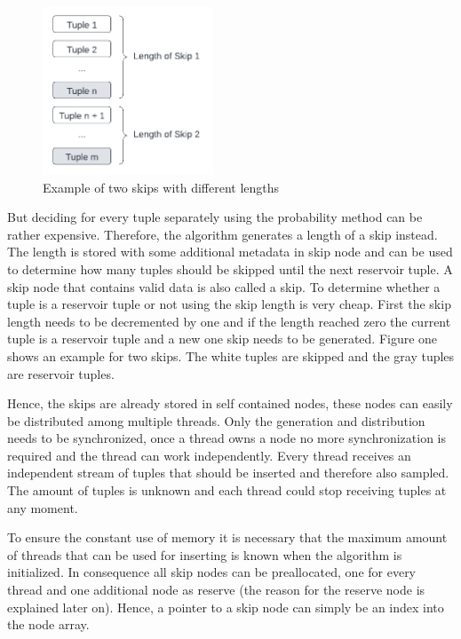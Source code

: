 \documentclass[acmlarge,nonacm]{acmart}
\begin{document}
        \begin{figure}
            \centering
            \includegraphics[height=5cm]{figure1.pdf}
            \caption{Example of two skips with different lengths}
        \end{figure}
        But deciding for every tuple separately using the probability method can be rather expensive. Therefore, the algorithm generates a length of a skip instead. The length is stored with some additional metadata in skip node and can be used to determine how many tuples should be skipped until the next reservoir tuple. A skip node that contains valid data is also called a skip. To determine whether a tuple is a reservoir tuple or not using the skip length is very cheap. First the skip length needs to be decremented by one and if the length reached zero the current tuple is a reservoir tuple and a new one skip needs to be generated. Figure one shows an example for two skips. The white tuples are skipped and the gray tuples are reservoir tuples.

        Hence, the skips are already stored in self contained nodes, these nodes can easily be distributed among multiple threads. Only the generation and distribution needs to be synchronized, 
        once a thread owns a node no more synchronization is required and the thread can work independently. Every thread receives an independent stream of tuples that should be inserted and therefore also sampled. The amount of tuples is unknown and each thread could stop receiving tuples at any moment.

        To ensure the constant use of memory it is necessary that the maximum amount of threads that can be used for inserting is known when the algorithm is initialized. In consequence all skip nodes can be preallocated, one for every thread and one additional node as reserve (the reason for the reserve node is explained later on). Hence, a pointer to a skip node can simply be an index into the node array.
\end{document}
